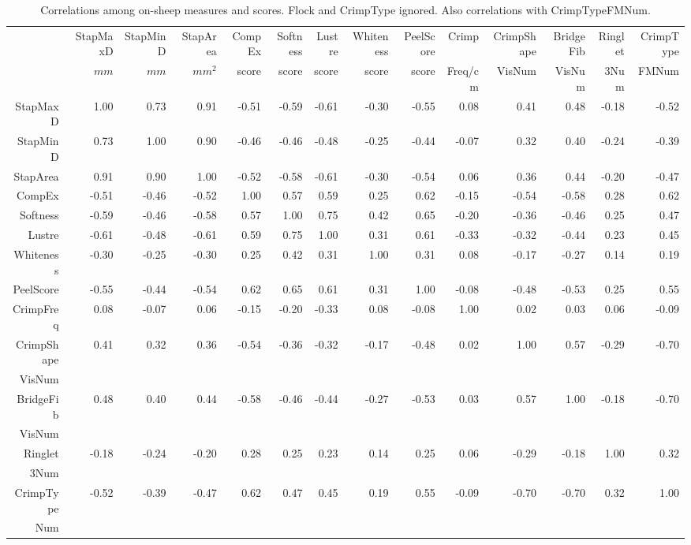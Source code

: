 \begin{landscape}
\begin{table}[ht]
\scriptsize
\centering
\caption{Correlations among on-sheep measures and scores. Flock and CrimpType ignored. Also correlations with CrimpTypeFMNum.}
\label{tab:correl}
\begin{tabular}{rrrrrrrrrrrrrr}
  \hline
 & StapMaxD & StapMinD & StapArea & CompEx & Softness & Lustre & Whiteness & PeelScore & Crimp & CrimpShape & BridgeFib & Ringlet & CrimpType \\ 
 & $mm$ & $mm$ & $mm^{2}$ & score & score & score & score & score & Freq/cm & VisNum & VisNum & 3Num &  FMNum \\
  \hline
StapMaxD & 1.00 & 0.73 & 0.91 & -0.51 & -0.59 & -0.61 & -0.30 & -0.55 & 0.08 & 0.41 & 0.48 & -0.18 & -0.52 \\ 
  StapMinD & 0.73 & 1.00 & 0.90 & -0.46 & -0.46 & -0.48 & -0.25 & -0.44 & -0.07 & 0.32 & 0.40 & -0.24 & -0.39 \\ 
  StapArea & 0.91 & 0.90 & 1.00 & -0.52 & -0.58 & -0.61 & -0.30 & -0.54 & 0.06 & 0.36 & 0.44 & -0.20 & -0.47 \\ 
  CompEx & -0.51 & -0.46 & -0.52 & 1.00 & 0.57 & 0.59 & 0.25 & 0.62 & -0.15 & -0.54 & -0.58 & 0.28 & 0.62 \\ 
  Softness & -0.59 & -0.46 & -0.58 & 0.57 & 1.00 & 0.75 & 0.42 & 0.65 & -0.20 & -0.36 & -0.46 & 0.25 & 0.47 \\ 
  Lustre & -0.61 & -0.48 & -0.61 & 0.59 & 0.75 & 1.00 & 0.31 & 0.61 & -0.33 & -0.32 & -0.44 & 0.23 & 0.45 \\ 
  Whiteness & -0.30 & -0.25 & -0.30 & 0.25 & 0.42 & 0.31 & 1.00 & 0.31 & 0.08 & -0.17 & -0.27 & 0.14 & 0.19 \\ 
  PeelScore & -0.55 & -0.44 & -0.54 & 0.62 & 0.65 & 0.61 & 0.31 & 1.00 & -0.08 & -0.48 & -0.53 & 0.25 & 0.55 \\ 
  CrimpFreq & 0.08 & -0.07 & 0.06 & -0.15 & -0.20 & -0.33 & 0.08 & -0.08 & 1.00 & 0.02 & 0.03 & 0.06 & -0.09 \\ 
  CrimpShape & 0.41 & 0.32 & 0.36 & -0.54 & -0.36 & -0.32 & -0.17 & -0.48 & 0.02 & 1.00 & 0.57 & -0.29 & -0.70 \\ 
  VisNum & & & & & & & & & & & & & \\
  BridgeFib & 0.48 & 0.40 & 0.44 & -0.58 & -0.46 & -0.44 & -0.27 & -0.53 & 0.03 & 0.57 & 1.00 & -0.18 & -0.70 \\ 
  VisNum & & & & & & & & & & & & & \\
  Ringlet & -0.18 & -0.24 & -0.20 & 0.28 & 0.25 & 0.23 & 0.14 & 0.25 & 0.06 & -0.29 & -0.18 & 1.00 & 0.32 \\ 
  3Num & & & & & & & & & & & & & \\
  CrimpType & -0.52 & -0.39 & -0.47 & 0.62 & 0.47 & 0.45 & 0.19 & 0.55 & -0.09 & -0.70 & -0.70 & 0.32 & 1.00 \\ 
  Num & & & & & & & & & & & & & \\
   \hline
\end{tabular}
\end{table}
\end{landscape}
